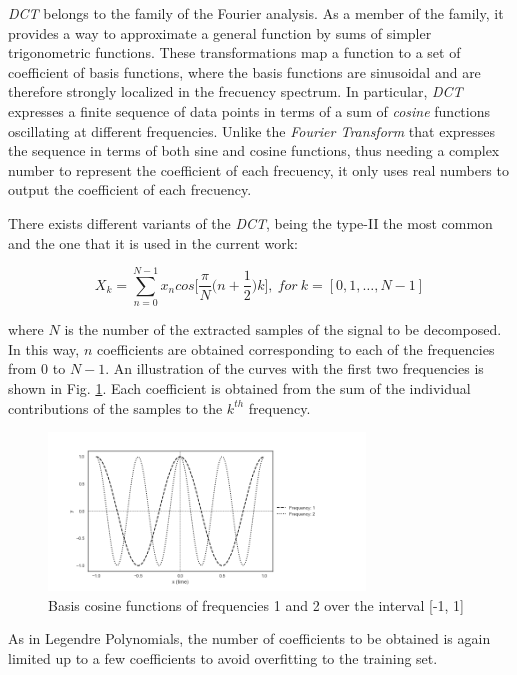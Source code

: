 \textit{DCT} belongs to the family of the Fourier analysis. As a member of the family, it
provides a way to approximate a general function by sums of simpler trigonometric functions.
These transformations map a function to a set of coefficient of basis functions, where
the basis functions are sinusoidal and are therefore strongly localized in the frecuency spectrum.
In particular, \textit{DCT} expresses a finite sequence of data points in terms of a sum of
\textit{cosine} functions oscillating at different frequencies. Unlike the
\textit{Fourier Transform} that expresses the sequence in terms of both sine and cosine functions,
thus needing a complex number to represent the coefficient of each frecuency, it only uses real
numbers to output the coefficient of each frecuency.

There exists different variants of the \textit{DCT}, being the type-II
the most common and the one that it is used in the current work:

\begin{equation}
X_{k} = \sum_{n=0}^{N-1} x_{n} cos \Big[ \frac{\pi}{N} \Big( n + \frac{1}{2} \Big) k \Big], \ for \ k = [0, 1, \dotsc, N-1]
\end{equation}

where $N$ is the number of the extracted samples of the signal to be decomposed.
In this way, $n$ coefficients are obtained corresponding to each of the frequencies from
$0$ to $N-1$. An illustration of the curves with the first two frequencies is shown in
Fig. \ref{fig:dct_base}. Each coefficient is obtained from the sum of the individual contributions
of the samples to the $k^{th}$ frequency.

\begin{figure}[H]
  \centering
  \includegraphics[width=0.75\textwidth]{files/figures/method/dct_base}
  \centering
  \caption{Basis cosine functions of frequencies 1 and 2 over the interval [-1, 1]}
  \label{fig:dct_base}
\end{figure}

As in Legendre Polynomials,
the number of coefficients to be obtained is again limited up to a few coefficients to
avoid overfitting to the training set.

